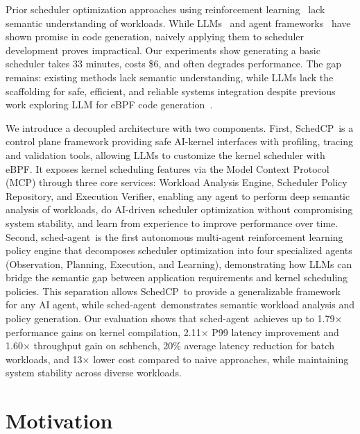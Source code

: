 \documentclass[preprint]{article}
\newcommand{\sys}{SchedCP\xspace}
\newcommand{\agent}{sched-agent\xspace}
\begin{document}
Prior scheduler optimization approaches using reinforcement learning~\cite{mao2019decima,qiu2020firm} lack semantic understanding of workloads. While LLMs~\cite{openai2023gpt4,anthropic2024claude} and agent frameworks~\cite{autogen,geminicli,claudecode,qian2024chatdev,hong2023metagpt} have shown promise in code generation, naively applying them to scheduler development proves impractical. Our experiments show generating a basic scheduler takes 33 minutes, costs \$6, and often degrades performance. The gap remains: existing methods lack semantic understanding, while LLMs lack the scaffolding for safe, efficient, and reliable systems integration despite previous work exploring LLM for eBPF code generation~\cite{kgent}.

We introduce a decoupled architecture with two components. First, \sys\ is a control plane framework providing safe AI-kernel interfaces with profiling, tracing and validation tools, allowing LLMs to customize the kernel scheduler with eBPF. It exposes kernel scheduling features via the Model Context Protocol (MCP) through three core services: Workload Analysis Engine, Scheduler Policy Repository, and Execution Verifier, enabling any agent to perform deep semantic analysis of workloads, do AI-driven scheduler optimization without compromising system stability, and learn from experience to improve performance over time. Second, \agent\ is the first autonomous multi-agent reinforcement learning policy engine that decomposes scheduler optimization into four specialized agents (Observation, Planning, Execution, and Learning), demonstrating how LLMs can bridge the semantic gap between application requirements and kernel scheduling policies. This separation allows \sys\ to provide a generalizable framework for any AI agent, while \agent\ demonstrates semantic workload analysis and policy generation. Our evaluation shows that \agent\ achieves up to 1.79× performance gains on kernel compilation, 2.11× P99 latency improvement and 1.60× throughput gain on schbench, 20\% average latency reduction for batch workloads, and 13× lower cost compared to naive approaches, while maintaining system stability across diverse workloads.

\section{Motivation}
\label{sec:motivation}
\end{document}
